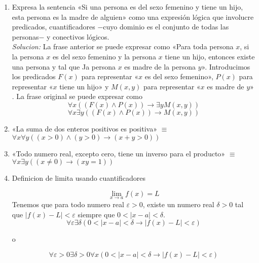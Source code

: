 \documentclass[]{article}
\begin{document}
\begin{enumerate}
	\item Expresa la sentencia «Si una persona es del sexo femenino y tiene un hijo, esta persona es la madre de alguien» como una expresión lógica que involucre predicados, cuantificadores $-$cuyo dominio es el conjunto de todas las personas$-$ y conectivos lógicos.\\
	\textit{Solucion:} La frase anterior se puede expresar como «Para toda persona $x$, si la persona $x$ es del sexo femenino y la persona $x$ tiene un hijo, entonces existe una persona y tal que Ja persona $x$ es madre de la persona $y$». Introducimos los predicados $F(x)$ para representar «$x$ es del sexo femenino», $P(x)$ para representar «$x$ tiene un hijo» y $M(x, y)$ para representar «$x$ es madre de $y$» . La frase original se puede expresar como 
	\begin{equation*}
		\forall{x}((F(x) \wedge P(x)) \rightarrow \exists{y}M(x, y))
	\end{equation*}
	\begin{equation*}
		\forall{x}\exists{y}((F(x) \wedge P(x)) \rightarrow M(x, y))
	\end{equation*}
	
	\item «La suma de dos enteros positivos es positiva» $\equiv$ $\forall{x}\forall{y} ((x > 0) \wedge (y > 0) \rightarrow (x + y > 0))$
	
	\item «Todo numero real, excepto cero, tiene un inverso para el producto» $\equiv$ $\forall{x}\exists{y} ((x \neq 0) \rightarrow (xy = 1))$
	
	\item Definicion de limita usando cuantificadores
	
	\begin{equation*}
		\lim_{x \rightarrow a} f(x) = L
	\end{equation*}
	Tenemos que para todo numero real $\varepsilon > 0$, existe un numero real $\delta > 0$ tal que $|f(x) - L| < \varepsilon$ siempre que $0 < |x - a| < \delta$.
	\begin{equation*}
		\forall{\varepsilon}\exists{\delta} (0 < |x - a| < \delta \rightarrow |f(x) - L| < \varepsilon)
	\end{equation*}
	\begin{center}
		o
	\end{center}
	\begin{equation*}
		\forall{\varepsilon} > 0 \exists{\delta} > 0 \forall{x} (0 < |x - a| < \delta \rightarrow |f(x) - L| < \varepsilon)
	\end{equation*}
\end{enumerate}
\end{document}

